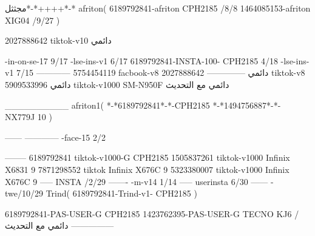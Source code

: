 مجثثل*-*++++*-*
afriton(
6189792841-afriton CPH2185  /8/8
1464085153-afriton XIG04  /9/27
)

2027888642 tiktok-v10
دائمي

-in-on-se-17 9/17
-lse-ins-v1 6/17
6189792841-INSTA-100- CPH2185 4/18
-lse-ins-v1 7/15
------------
5754454119 facbook-v8
دائمي
--------------
2027888642 tiktok-v8
دائمي
5909533996 tiktok-v1000  SM-N950F
دائمي مع التحديث

__________
afriton1(
*-*6189792841*-*-CPH2185
*-*1494756887*-*- NX779J 10\1
)


------
------------
-face-15 2/2

--------
6189792841 tiktok-v1000-G CPH2185 
1505837261 tiktok-v1000 Infinix X6831 9
7871298552 tiktok  Infinix X676C 9
5323380007 tiktok-v1000  Infinix X676C 9
-----
 INSTA /2/29
-------
-m-v14 1/14
-----
userinsta 6/30
------
-twe/10/29
Trind(
6189792841-Trind-v1- CPH2185 
)


6189792841-PAS-USER-G CPH2185 
1423762395-PAS-USER-G TECNO KJ6  /دائمي مع التحديث
    ---------------
